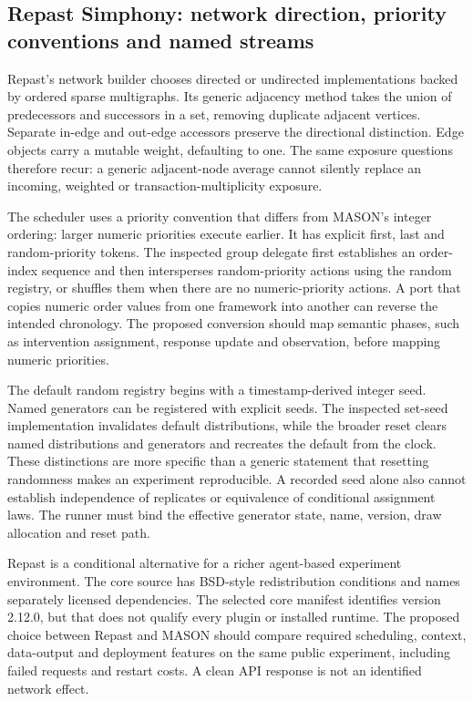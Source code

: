 \subsection{Repast Simphony: network direction, priority conventions and named streams}

Repast's network builder chooses directed or undirected implementations backed by ordered sparse multigraphs. Its generic adjacency method takes the union of predecessors and successors in a set, removing duplicate adjacent vertices. Separate in-edge and out-edge accessors preserve the directional distinction. Edge objects carry a mutable weight, defaulting to one. The same exposure questions therefore recur: a generic adjacent-node average cannot silently replace an incoming, weighted or transaction-multiplicity exposure.\citep{exec25_jnet_repast}

The scheduler uses a priority convention that differs from MASON's integer ordering: larger numeric priorities execute earlier. It has explicit first, last and random-priority tokens. The inspected group delegate first establishes an order-index sequence and then intersperses random-priority actions using the random registry, or shuffles them when there are no numeric-priority actions. A port that copies numeric order values from one framework into another can reverse the intended chronology. The proposed conversion should map semantic phases, such as intervention assignment, response update and observation, before mapping numeric priorities.\citep{exec25_jnet_repast}

The default random registry begins with a timestamp-derived integer seed. Named generators can be registered with explicit seeds. The inspected set-seed implementation invalidates default distributions, while the broader reset clears named distributions and generators and recreates the default from the clock. These distinctions are more specific than a generic statement that resetting randomness makes an experiment reproducible. A recorded seed alone also cannot establish independence of replicates or equivalence of conditional assignment laws. The runner must bind the effective generator state, name, version, draw allocation and reset path.\citep{exec25_jnet_repast}

Repast is a conditional alternative for a richer agent-based experiment environment. The core source has BSD-style redistribution conditions and names separately licensed dependencies. The selected core manifest identifies version 2.12.0, but that does not qualify every plugin or installed runtime. The proposed choice between Repast and MASON should compare required scheduling, context, data-output and deployment features on the same public experiment, including failed requests and restart costs. A clean API response is not an identified network effect.\citep{exec25_jnet_repast,exec25_jnet_choice}

